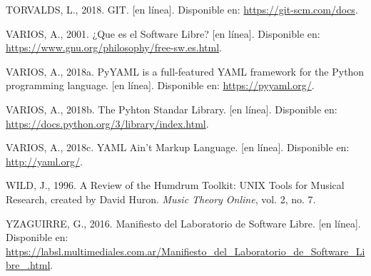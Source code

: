 \documentclass[]{article}
\begin{document}
\leavevmode\hypertarget{ref-git}{}%
TORVALDS, L., 2018. GIT. {[}en línea{]}. Disponible en:
\url{https://git-scm.com/docs}.

\leavevmode\hypertarget{ref-gnu}{}%
VARIOS, A., 2001. ¿Que es el Software Libre? {[}en línea{]}. Disponible
en: \url{https://www.gnu.org/philosophy/free-sw.es.html}.

\leavevmode\hypertarget{ref-pyyaml}{}%
VARIOS, A., 2018a. PyYAML is a full-featured YAML framework for the
Python programming language. {[}en línea{]}. Disponible en:
\url{https://pyyaml.org/}.

\leavevmode\hypertarget{ref-standarlib}{}%
VARIOS, A., 2018b. The Pyhton Standar Library. {[}en línea{]}.
Disponible en: \url{https://docs.python.org/3/library/index.html}.

\leavevmode\hypertarget{ref-yaml}{}%
VARIOS, A., 2018c. YAML Ain't Markup Language. {[}en línea{]}.
Disponible en: \url{http://yaml.org/}.

\leavevmode\hypertarget{ref-wild}{}%
WILD, J., 1996. A Review of the Humdrum Toolkit: UNIX Tools for Musical
Research, created by David Huron. \emph{Music Theory Online}, vol. 2,
no. 7.

\leavevmode\hypertarget{ref-yzaguirre}{}%
YZAGUIRRE, G., 2016. Manifiesto del Laboratorio de Software Libre. {[}en
línea{]}. Disponible en:
\url{https://labsl.multimediales.com.ar/Manifiesto_del_Laboratorio_de_Software_Libre_.html}.
\end{document}
